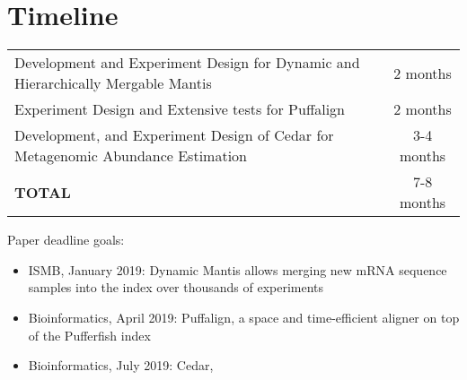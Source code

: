 \section{Timeline}

\renewcommand{\arraystretch}{2.0}
\begin{center}
    \begin{tabularx}{\linewidth}{|X|c|}
        \hline
        Development and Experiment Design for Dynamic and Hierarchically Mergable Mantis & 2 months \\
        Experiment Design and Extensive tests for Puffalign & 2 months \\
        Development, and Experiment Design of Cedar for Metagenomic Abundance Estimation & 3-4 months \\
        \hline
        \textbf{TOTAL} & 7-8 months \\
        \hline
    \end{tabularx}

\end{center}


Paper deadline goals:

\begin{itemize}
    \item ISMB, January 2019: Dynamic Mantis allows merging new mRNA sequence samples into the index over
    thousands of experiments
    \item Bioinformatics, April 2019: Puffalign, a space and time-efficient aligner on top of the Pufferfish index
    \item Bioinformatics, July 2019: Cedar,
\end{itemize}


